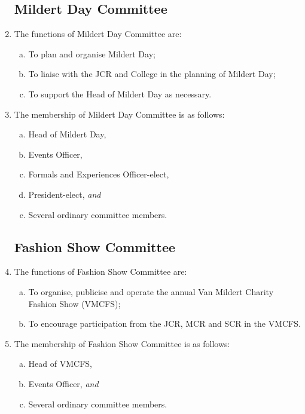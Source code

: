 \documentclass[12pt]{article}
\begin{document}
\begin{enumerate}
    \subsection{Mildert Day Committee}
    \item The functions of Mildert Day Committee are:
    \begin{enumerate}[(a)]
        \item To plan and organise Mildert Day;
        \item To liaise with the JCR and College in the planning of Mildert Day;
        \item To support the Head of Mildert Day as necessary.
    \end{enumerate}
    \item The membership of Mildert Day Committee is as follows:
    \begin{enumerate}[(a)]
        \item Head of Mildert Day,
        \item Events Officer,
        \item Formals and Experiences Officer-elect,
        \item President-elect, \emph{and}
        \item Several ordinary committee members.
    \end{enumerate}

    \subsection{Fashion Show Committee}
    \item The functions of Fashion Show Committee are:
    \begin{enumerate}[(a)]
        \item To organise, publicise and operate the annual Van Mildert Charity Fashion Show (VMCFS);
        \item To encourage participation from the JCR, MCR and SCR in the VMCFS.
    \end{enumerate}
    \item The membership of Fashion Show Committee is as follows:
    \begin{enumerate}[(a)]
        \item Head of VMCFS,
        \item Events Officer, \emph{and}
        \item Several ordinary committee members.
    \end{enumerate}


\end{enumerate}
\end{document}
